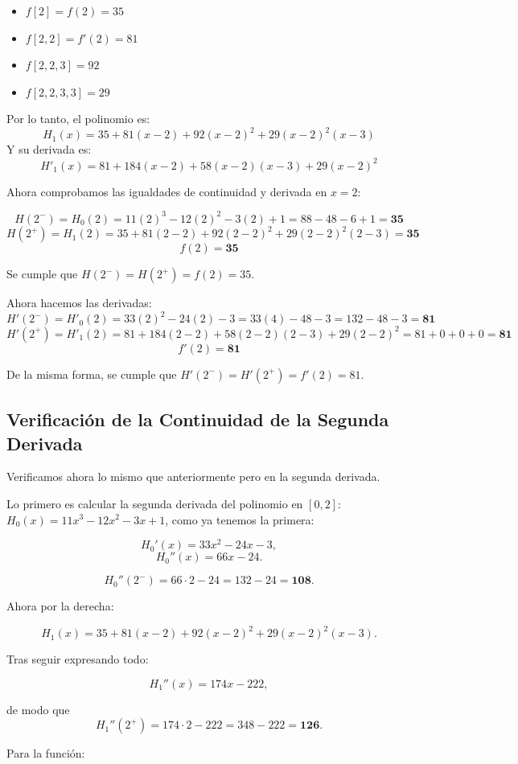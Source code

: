 \documentclass{article}
\begin{document}
\begin{itemize}
    \item \(f[2] = f(2) = 35\)
    \item \(f[2,2] = f'(2) = 81\)
    \item \(f[2,2,3]  = 92\)
    \item \(f[2,2,3,3] = 29\)
\end{itemize}
Por lo tanto, el polinomio es:
$$ H_1(x) = 35 + 81(x-2) + 92(x-2)^2 + 29(x-2)^2(x-3) $$
Y su derivada es:
$$ H'_1(x) = 81 + 184(x-2) + 58(x-2)(x-3) + 29(x-2)^2 $$

Ahora comprobamos las igualdades de continuidad y derivada en \(x=2\):

$$ H(2^-) = H_0(2) = 11(2)^3 - 12(2)^2 - 3(2) + 1  = 88 - 48 - 6 + 1 = \mathbf{35} $$
$$ H(2^+) = H_1(2) = 35 + 81(2-2) + 92(2-2)^2 + 29(2-2)^2(2-3) =  \mathbf{35} $$
$$ f(2) = \mathbf{35} $$

Se cumple que \(H(2^-) = H(2^+) = f(2) = 35\).

Ahora hacemos las derivadas:
$$ H'(2^-) = H'_0(2) = 33(2)^2 - 24(2) - 3 = 33(4) - 48 - 3 = 132 - 48 - 3 = \mathbf{81} $$
$$ H'(2^+) = H'_1(2) = 81 + 184(2-2) + 58(2-2)(2-3) + 29(2-2)^2 = 81 + 0 + 0 + 0 = \mathbf{81} $$
$$ f'(2) = \mathbf{81} $$

De la misma forma, se cumple que \(H'(2^-) = H'(2^+) = f'(2) = 81\).

\subsection{Verificación de la Continuidad de la Segunda Derivada}

Verificamos ahora lo mismo que anteriormente pero en la segunda derivada.

Lo primero es calcular la segunda derivada del polinomio en \([0,2]\): \(H_0(x)=11x^3-12x^2-3x+1\), como ya tenemos la primera:

\[
H_0'(x)=33x^2-24x-3,
\]
\[
H_0''(x)=66x-24.
\]

\[
H_0''(2^-) = 66\cdot2 - 24 = 132 - 24 = \mathbf{108}.
\]

Ahora por la derecha:

\[
H_1(x) = 35 + 81(x-2) + 92(x-2)^2 + 29(x-2)^2(x-3).
\]

Tras seguir expresando todo:

\[
H_1''(x) = 174x - 222,
\]

de modo que
\[
H_1''(2^+) = 174\cdot2 - 222 = 348 - 222 = \mathbf{126}.
\]

Para la función:
\end{document}
